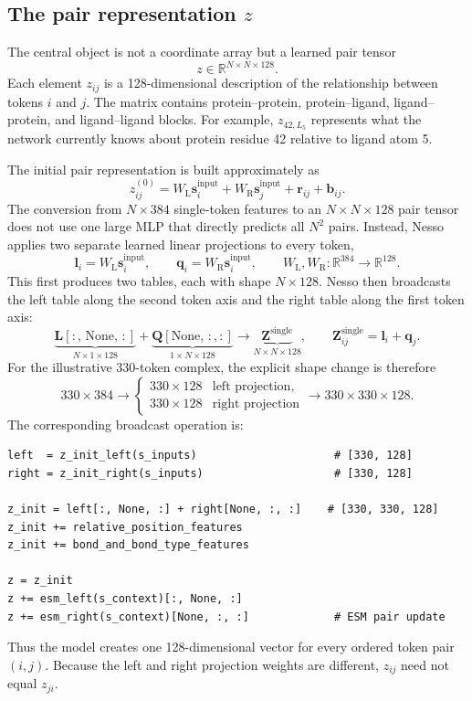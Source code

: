 \documentclass[11pt]{article}
\begin{document}
\subsection{The pair representation \texorpdfstring{$z$}{z}}

The central object is not a coordinate array but a learned pair tensor
\[
  z\in\mathbb R^{N\times N\times128}.
\]
Each element $z_{ij}$ is a 128-dimensional description of the relationship
between tokens $i$ and $j$. The matrix contains protein--protein,
protein--ligand, ligand--protein, and ligand--ligand blocks. For example,
$z_{42,L_5}$ represents what the network currently knows about protein residue
42 relative to ligand atom 5.

The initial pair representation is built approximately as
\[
  z_{ij}^{(0)}
  =W_{\mathrm L}\mathbf s_i^{\mathrm{input}}
  +W_{\mathrm R}\mathbf s_j^{\mathrm{input}}
  +\mathbf r_{ij}
  +\mathbf b_{ij}.
\]
The conversion from $N\times384$ single-token features to an
$N\times N\times128$ pair tensor does not use one large MLP that directly
predicts all $N^2$ pairs. Instead, Nesso applies two separate learned linear
projections to every token,
\[
  \mathbf l_i=W_{\mathrm L}\mathbf s_i^{\mathrm{input}},
  \qquad
  \mathbf q_i=W_{\mathrm R}\mathbf s_i^{\mathrm{input}},
  \qquad
  W_{\mathrm L},W_{\mathrm R}:\mathbb R^{384}\rightarrow\mathbb R^{128}.
\]
This first produces two tables, each with shape $N\times128$. Nesso then
broadcasts the left table along the second token axis and the right table along
the first token axis:
\[
  \underbrace{\mathbf L[:,\,\mathrm{None},\,:]}_{N\times1\times128}
  +
  \underbrace{\mathbf Q[\mathrm{None},\,:,:]}_{1\times N\times128}
  \longrightarrow
  \underbrace{\mathbf Z^{\mathrm{single}}}_{N\times N\times128},
  \qquad
  \mathbf Z^{\mathrm{single}}_{ij}=\mathbf l_i+\mathbf q_j.
\]
For the illustrative 330-token complex, the explicit shape change is therefore
\[
  330\times384
  \longrightarrow
  \begin{cases}
    330\times128 & \text{left projection},\\
    330\times128 & \text{right projection}
  \end{cases}
  \longrightarrow
  330\times330\times128.
\]
The corresponding broadcast operation is:
\begin{verbatim}
left  = z_init_left(s_inputs)                     # [330, 128]
right = z_init_right(s_inputs)                    # [330, 128]

z_init = left[:, None, :] + right[None, :, :]    # [330, 330, 128]
z_init += relative_position_features
z_init += bond_and_bond_type_features

z = z_init
z += esm_left(s_context)[:, None, :]
z += esm_right(s_context)[None, :, :]             # ESM pair update
\end{verbatim}
Thus the model creates one 128-dimensional vector for every ordered token pair
$(i,j)$. Because the left and right projection weights are different,
$z_{ij}$ need not equal $z_{ji}$.
\end{document}
